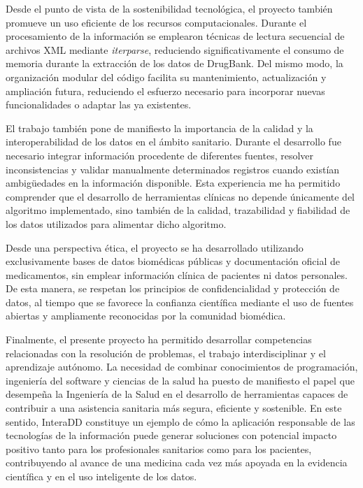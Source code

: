 Desde el punto de vista de la sostenibilidad tecnológica, el proyecto también promueve un uso eficiente de los recursos computacionales. Durante el procesamiento de la información se emplearon técnicas de lectura secuencial de archivos XML mediante \textit{iterparse}, reduciendo significativamente el consumo de memoria durante la extracción de los datos de DrugBank. Del mismo modo, la organización modular del código facilita su mantenimiento, actualización y ampliación futura, reduciendo el esfuerzo necesario para incorporar nuevas funcionalidades o adaptar las ya existentes.

El trabajo también pone de manifiesto la importancia de la calidad y la interoperabilidad de los datos en el ámbito sanitario. Durante el desarrollo fue necesario integrar información procedente de diferentes fuentes, resolver inconsistencias y validar manualmente determinados registros cuando existían ambigüedades en la información disponible. Esta experiencia me ha permitido comprender que el desarrollo de herramientas clínicas no depende únicamente del algoritmo implementado, sino también de la calidad, trazabilidad y fiabilidad de los datos utilizados para alimentar dicho algoritmo.

Desde una perspectiva ética, el proyecto se ha desarrollado utilizando exclusivamente bases de datos biomédicas públicas y documentación oficial de medicamentos, sin emplear información clínica de pacientes ni datos personales. De esta manera, se respetan los principios de confidencialidad y protección de datos, al tiempo que se favorece la confianza científica mediante el uso de fuentes abiertas y ampliamente reconocidas por la comunidad biomédica.

Finalmente, el presente proyecto ha permitido desarrollar competencias relacionadas con la resolución de problemas, el trabajo interdisciplinar y el aprendizaje autónomo. La necesidad de combinar conocimientos de programación, ingeniería del software y ciencias de la salud ha puesto de manifiesto el papel que desempeña la Ingeniería de la Salud en el desarrollo de herramientas capaces de contribuir a una asistencia sanitaria más segura, eficiente y sostenible. En este sentido, InteraDD constituye un ejemplo de cómo la aplicación responsable de las tecnologías de la información puede generar soluciones con potencial impacto positivo tanto para los profesionales sanitarios como para los pacientes, contribuyendo al avance de una medicina cada vez más apoyada en la evidencia científica y en el uso inteligente de los datos.
